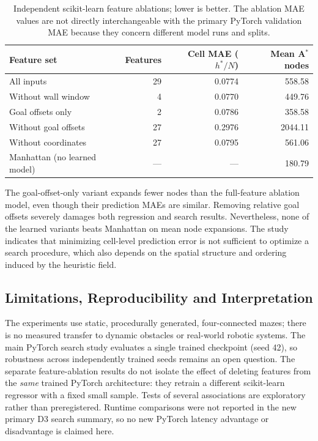 \begin{table}[H]
\centering
\small
\begin{tabular}{lrrr}
\toprule
Feature set & Features & Cell MAE ($h^\ast/N$) & Mean A$^\ast$ nodes \\
\midrule
All inputs & 29 & 0.0774 & 558.58 \\
Without wall window & 4 & 0.0770 & 449.76 \\
Goal offsets only & 2 & 0.0786 & 358.58 \\
Without goal offsets & 27 & 0.2976 & 2044.11 \\
Without coordinates & 27 & 0.0795 & 561.06 \\
\midrule
Manhattan (no learned model) & --- & --- & 180.79 \\
\bottomrule
\end{tabular}
\caption{Independent scikit-learn feature ablations; lower is better.
The ablation MAE values are not directly interchangeable with the primary
PyTorch validation MAE because they concern different model runs and splits.}
\label{tab:d3-feature}
\end{table}

The goal-offset-only variant expands fewer nodes than the full-feature
ablation model, even though their prediction MAEs are similar. Removing
relative goal offsets severely damages both regression and search results.
Nevertheless, none of the learned variants beats Manhattan on mean node
expansions. The study indicates that minimizing cell-level prediction error
is not sufficient to optimize a search procedure, which also depends on the
spatial structure and ordering induced by the heuristic field.

\subsection{Limitations, Reproducibility and Interpretation}
\label{sec:d3-limitations}
The experiments use static, procedurally generated, four-connected mazes;
there is no measured transfer to dynamic obstacles or real-world robotic
systems. The main PyTorch search study evaluates a single trained checkpoint
(seed 42), so robustness across independently trained seeds remains an open
question. The separate feature-ablation results do not isolate the effect
of deleting features from the \emph{same} trained PyTorch architecture:
they retrain a different scikit-learn regressor with a fixed small sample.
Tests of several associations are exploratory rather than preregistered.
Runtime comparisons were not reported in the new primary D3 search summary,
so no new PyTorch latency advantage or disadvantage is claimed here.

